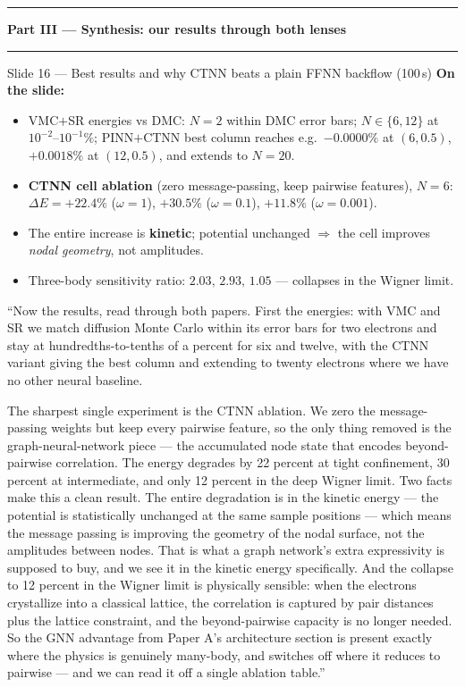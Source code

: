 \documentclass[11pt]{article}
\begin{document}
\vspace{2em}\hrule
\begin{center}\Large\textbf{Part III --- Synthesis: our results through both lenses}\end{center}
\hrule\vspace{1em}

\begin{slide}{Slide 16 --- Best results and why CTNN beats a plain FFNN backflow (100\,s)}
\textbf{On the slide:}
\begin{itemize}[leftmargin=*]
\item VMC$+$SR energies vs DMC: $N{=}2$ within DMC error bars; $N\in\{6,12\}$ at
$10^{-2}$--$10^{-1}\%$; PINN$+$CTNN best column reaches e.g.\ $-0.0000\%$ at $(6,0.5)$,
$+0.0018\%$ at $(12,0.5)$, and extends to $N{=}20$.
\item \textbf{CTNN cell ablation} (zero message-passing, keep pairwise features), $N{=}6$:
$\Delta E=+22.4\%$ ($\omega{=}1$), $+30.5\%$ ($\omega{=}0.1$), $+11.8\%$ ($\omega{=}0.001$).
\item The entire increase is \textbf{kinetic}; potential unchanged $\Rightarrow$ the cell improves
\emph{nodal geometry}, not amplitudes.
\item Three-body sensitivity ratio: $2.03,\,2.93,\,1.05$ --- collapses in the Wigner limit.
\end{itemize}
\end{slide}

\begin{say}
``Now the results, read through both papers. First the energies: with VMC and SR we match diffusion
Monte Carlo within its error bars for two electrons and stay at hundredths-to-tenths of a percent for
six and twelve, with the CTNN variant giving the best column and extending to twenty electrons where
we have no other neural baseline.

The sharpest single experiment is the CTNN ablation. We zero the message-passing weights but keep
every pairwise feature, so the only thing removed is the graph-neural-network piece --- the
accumulated node state that encodes beyond-pairwise correlation. The energy degrades by 22 percent at
tight confinement, 30 percent at intermediate, and only 12 percent in the deep Wigner limit. Two
facts make this a clean result. The entire degradation is in the kinetic energy --- the potential is
statistically unchanged at the same sample positions --- which means the message passing is improving
the geometry of the nodal surface, not the amplitudes between nodes. That is what a graph network's
extra expressivity is supposed to buy, and we see it in the kinetic energy specifically. And the
collapse to 12 percent in the Wigner limit is physically sensible: when the electrons crystallize
into a classical lattice, the correlation is captured by pair distances plus the lattice constraint,
and the beyond-pairwise capacity is no longer needed. So the GNN advantage from Paper A's architecture
section is present exactly where the physics is genuinely many-body, and switches off where it
reduces to pairwise --- and we can read it off a single ablation table.''
\end{say}
\end{document}
